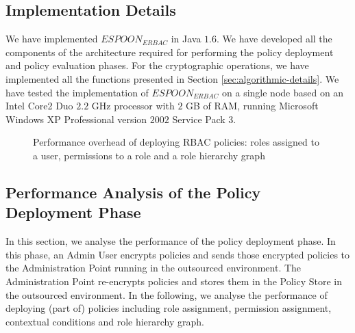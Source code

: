 \documentclass[final,5p,times,twocolumn]{elsarticle}
\begin{document}
\subsection{Implementation Details}

We have implemented $\mathit{ESPOON_{ERBAC}}$ in Java $1.6$. We have developed all the components of the architecture required for performing the policy deployment and policy evaluation phases. For the cryptographic operations, we have implemented all the functions presented in Section \ref{sec:algorithmic-details}. We have tested the implementation of $\mathit{ESPOON_{ERBAC}}$ on a single node based on an Intel Core2 Duo $2.2$ GHz processor with $2$ GB of RAM, running Microsoft Windows XP Professional version $2002$ Service Pack $3$. 

\begin{figure*}
\centering
{}
\caption{Performance overhead of deploying RBAC policies:  roles assigned to a user,  permissions to a role and  a role hierarchy graph}
\label{fig:policy-deployment-rbac-policy}
\end{figure*}

\subsection{Performance Analysis of the Policy Deployment Phase}
In this section, we analyse the performance of the policy deployment phase. In this phase, an Admin User encrypts policies and sends those encrypted policies to the Administration Point running in the outsourced environment. The Administration Point re-encrypts policies and stores them in the Policy Store in the outsourced environment. In the following, we analyse the performance of deploying (part of) policies including role assignment, permission assignment, contextual conditions and role hierarchy graph.
\end{document}
